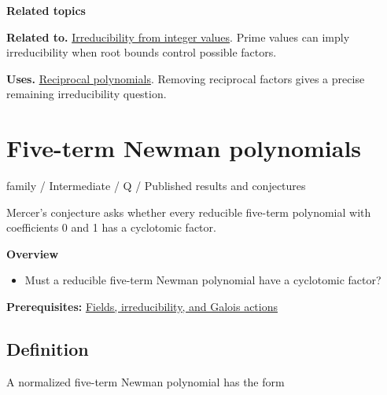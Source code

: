 \documentclass[11pt,a4paper,oneside,openany]{book}
\begin{document}
\par\medskip\begingroup\footnotesize\setlength{\parskip}{1pt}\textbf{\sffamily\color{atlasgreen}Related topics}\par
\color{black}\textbf{Related to.} \hyperlink{article:integer-values}{Irreducibility from integer values}. Prime values can imply irreducibility when root bounds control possible factors.\par
\color{black}\textbf{Uses.} \hyperlink{article:reciprocity}{Reciprocal polynomials}. Removing reciprocal factors gives a precise remaining irreducibility question.\par
\endgroup
\chapter{Five-term Newman polynomials}\label{article:newman-pentanomials}\hypertarget{article:newman-pentanomials}{}\color{black}
{\sffamily\small\color{atlasgold}family / Intermediate / Q / Published results and conjectures}\par\medskip
Mercer's conjecture asks whether every reducible five-term polynomial with coefficients 0 and 1 has a cyclotomic factor.\par\medskip
\textbf{Overview}\begin{itemize}
\item Must a reducible five-term Newman polynomial have a cyclotomic factor?
\end{itemize}
{\small\textbf{Prerequisites:} \hyperlink{article:foundations}{Fields, irreducibility, and Galois actions}}\par
{}\section{Definition}
\color{black} A normalized five-term Newman polynomial has the form\par
\end{document}
